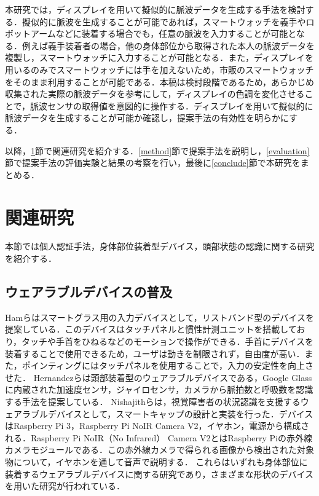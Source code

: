 \documentclass[submit,techrep]{ipsj}
\begin{document}
本研究では，ディスプレイを用いて擬似的に脈波データを生成する手法を検討する．擬似的に脈波を生成することが可能であれば，スマートウォッチを義手やロボットアームなどに装着する場合でも，任意の脈波を入力することが可能となる．例えば義手装着者の場合，他の身体部位から取得された本人の脈波データを複製し，スマートウォッチに入力することが可能となる．また，ディスプレイを用いるのみでスマートウォッチには手を加えないため，市販のスマートウォッチをそのまま利用することが可能である．本稿は検討段階であるため，あらかじめ収集された実際の脈波データを参考にして，ディスプレイの色調を変化させることで，脈波センサの取得値を意図的に操作する．ディスプレイを用いて擬似的に脈波データを生成することが可能か確認し，提案手法の有効性を明らかにする．
\par

以降，\ref{related}節で関連研究を紹介する．\ref{method}節で提案手法を説明し，\ref{evaluation}節で提案手法の評価実験と結果の考察を行い，最後に\ref{conclude}節で本研究をまとめる．


\section{関連研究}
\label{related}
本節では個人認証手法，身体部位装着型デバイス，頭部状態の認識に関する研究を紹介する．

\subsection{ウェアラブルデバイスの普及}
Hamら\cite{smart_wristband}はスマートグラス用の入力デバイスとして，リストバンド型のデバイスを提案している．このデバイスはタッチパネルと慣性計測ユニットを搭載しており，タッチや手首をひねるなどのモーションで操作ができる．手首にデバイスを装着することで使用できるため，ユーザは動きを制限されず，自由度が高い．また，ポインティングにはタッチパネルを使用することで，入力の安定性を向上させた．
Hernandezら\cite{bioglass}は頭部装着型のウェアラブルデバイスである，Google Glassに内蔵された加速度センサ，ジャイロセンサ，カメラから脈拍数と呼吸数を認識する手法を提案している．
Nishajithら\cite{smart_cap}は，視覚障害者の状況認識を支援するウェアラブルデバイスとして，スマートキャップの設計と実装を行った．デバイスはRaspberry Pi 3，Raspberry Pi NoIR Camera V2，イヤホン，電源から構成される．Raspberry Pi NoIR（No Infrared） Camera V2とはRaspberry Piの赤外線カメラモジュールである．この赤外線カメラで得られる画像から検出された対象物について，イヤホンを通して音声で説明する．
これらはいずれも身体部位に装着するウェアラブルデバイスに関する研究であり，さまざまな形状のデバイスを用いた研究が行われている．
\par
\end{document}
